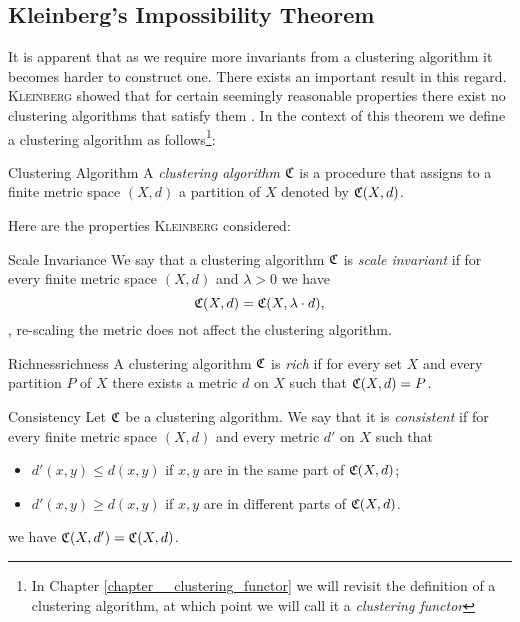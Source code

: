 \subsection{Kleinberg's Impossibility Theorem}
It is apparent that as we require more invariants from a clustering algorithm it becomes harder to construct one.
There exists an important result in this regard.
\textsc{Kleinberg} showed that for certain seemingly reasonable properties there exist no clustering algorithms that satisfy them \cite{Kleinberg2002}.
In the context of this theorem we define a clustering algorithm as follows\footnote{In Chapter \ref{chapter__clustering_functor} we will revisit the definition of a clustering algorithm, at which point we will call it a \emph{clustering functor}}:

\begin{definition}{Clustering Algorithm}{}
A \emph{clustering algorithm} $\mathfrak{C}$ is a procedure that assigns to a finite metric space $(X,d)$ a partition of $X$ denoted by $\mathfrak{C}(X,d)$.
\end{definition}


Here are the properties \textsc{Kleinberg} considered:

\begin{definition}{Scale Invariance}{}
We say that a clustering algorithm $\mathfrak{C}$ is \emph{scale invariant} if for every finite metric space $(X,d)$ and $\lambda > 0$ we have
$$
\mathfrak{C}(X,d) = \mathfrak{C}(X, \lambda \cdot d),
$$
\ie, re-scaling the metric does not affect the clustering algorithm.
\end{definition}

\begin{definition}{Richness}{richness}
A clustering algorithm $\mathfrak{C}$ is \emph{rich} if for every set $X$ and every partition $P$ of $X$ there exists a metric $d$ on $X$ such that $\mathfrak{C}(X,d) = P$.
\end{definition}

\begin{definition}{Consistency}{}
Let $\mathfrak{C}$ be a clustering algorithm. We say that it is \emph{consistent} if for every finite metric space $(X,d)$ and every metric $d'$ on $X$ such that
\begin{itemize}
    \item $d'(x,y) \leq d(x,y)$ if $x,y$ are in the same part of $\mathfrak{C}(X,d)$;
    \item $d'(x,y) \geq d(x,y)$ if $x,y$ are in different parts of $\mathfrak{C}(X,d)$.
\end{itemize}
we have $\mathfrak{C}(X,d') = \mathfrak{C}(X,d)$.
\end{definition}

